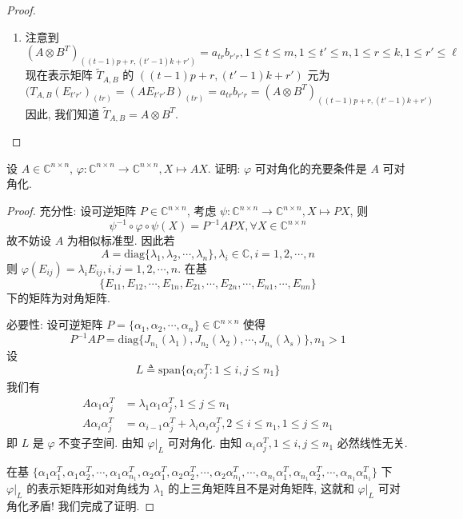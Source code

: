 \documentclass[../../main.tex]{subfiles}%
\begin{document}
\begin{proof}
\begin{enumerate}
\item 注意到
$$(A \otimes B^T)_{((t - 1)p + r, (t' - 1)k + r')} = a_{tr} b_{r'r}, 1 \leqslant  t \leqslant  m, 1 \leqslant  t' \leqslant  n, 1 \leqslant  r \leqslant  k, 1 \leqslant  r' \leqslant  \ell$$
现在表示矩阵 $\widetilde{T}_{A,B}$ 的 $((t - 1)p + r, (t' - 1)k + r')$ 元为
$$(T_{A,B}(E_{t'r'})_{(tr)} = (AE_{t'r'}B)_{(tr)} = a_{tr} b_{r'r} = (A \otimes B^T)_{((t - 1)p + r, (t' - 1)k + r')}$$
因此, 我们知道 $\widetilde{T}_{A,B} = A \otimes B^T$.
\end{enumerate}
\end{proof}

\begin{example}
设 $A \in \mathbb{C}^{n \times n}$, $\varphi : \mathbb{C}^{n \times n} \to \mathbb{C}^{n \times n}, X \mapsto AX$. 证明: $\varphi$ 可对角化的充要条件是 $A$ 可对角化.
\end{example}
\begin{proof}

{\heiti 充分性:}
设可逆矩阵 $P \in \mathbb{C}^{n \times n}$, 考虑 $\psi : \mathbb{C}^{n \times n} \to \mathbb{C}^{n \times n}, X \mapsto PX$, 则
$$\psi^{-1} \circ \varphi \circ \psi (X) = P^{-1}APX, \forall X \in \mathbb{C}^{n \times n}$$
故不妨设 $A$ 为相似标准型. 因此若
$$A = \mathrm{diag}\{\lambda_1, \lambda_2, \cdots, \lambda_n\}, \lambda_i \in \mathbb{C}, i = 1, 2, \cdots, n$$
则 $\varphi(E_{ij}) = \lambda_i E_{ij}, i, j = 1, 2, \cdots, n$. 在基
$$\{E_{11}, E_{12}, \cdots, E_{1n}, E_{21}, \cdots, E_{2n}, \cdots, E_{n1}, \cdots, E_{nn}\}$$
下的矩阵为对角矩阵.

{\heiti 必要性:}
设可逆矩阵 $P = \{\alpha_1, \alpha_2, \cdots, \alpha_n\} \in \mathbb{C}^{n \times n}$ 使得
$$P^{-1}AP = \mathrm{diag}\{J_{n_1}(\lambda_1), J_{n_2}(\lambda_2), \cdots, J_{n_s}(\lambda_s)\}, n_1 > 1$$
设
$$L \triangleq \mathrm{span}\{\alpha_i \alpha_j^T : 1 \leqslant  i, j \leqslant  n_1\}$$
我们有
\begin{align*}
A\alpha_1 \alpha_j^T &= \lambda_1 \alpha_1 \alpha_j^T, 1 \leqslant  j \leqslant  n_1 \\
A\alpha_i \alpha_j^T &= \alpha_{i - 1} \alpha_j^T + \lambda_i \alpha_i \alpha_j^T, 2 \leqslant  i \leqslant  n_1, 1 \leqslant  j \leqslant  n_1
\end{align*}
即 $L$ 是 $\varphi$ 不变子空间. 由知 $\varphi|_L$ 可对角化. 由知 $\alpha_i \alpha_j^T, 1 \leqslant  i, j \leqslant  n_1$ 必然线性无关.

在基 $\{\alpha_1 \alpha_1^T, \alpha_1 \alpha_2^T, \cdots, \alpha_1 \alpha_{n_1}^T, \alpha_2 \alpha_1^T, \alpha_2 \alpha_2^T, \cdots, \alpha_2 \alpha_{n_1}^T, \cdots, \alpha_{n_1} \alpha_1^T, \alpha_{n_1} \alpha_2^T, \cdots, \alpha_{n_1} \alpha_{n_1}^T\}$ 下 $\varphi|_L$ 的表示矩阵形如对角线为 $\lambda_1$ 的上三角矩阵且不是对角矩阵, 这就和 $\varphi|_L$ 可对角化矛盾! 我们完成了证明.
\end{proof}
\end{document}

